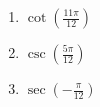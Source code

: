 \documentclass{ximera}
\begin{document}
\begin{multicols}{3}

\begin{enumerate}

\setcounter{enumi}{\value{HW}}

\item $\cot \left( \frac{11\pi}{12} \right)$
\item $\csc \left( \frac{5\pi}{12} \right)$
\item $\sec \left( -\frac{\pi}{12} \right)$  \label{sumdifflast}

\setcounter{HW}{\value{enumi}}

\end{enumerate}

\end{multicols}
\end{document}
